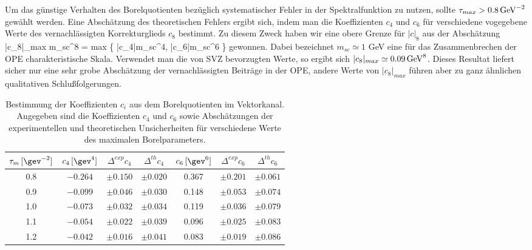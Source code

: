 Um das g\"unstige Verhalten des Borelquotienten bez\"uglich 
systematischer Fehler in der Spektralfunktion zu nutzen, sollte
$\tau_{max}>0.8\,{\rm GeV}^{-2}$ gew\"ahlt werden. Eine 
Absch\"atzung des theoretischen Fehlers ergibt sich, indem man
die Koeffizienten $c_4$ und $c_6$ f\"ur verschiedene vogegebene
Werte des vernachl\"assigten Korrekturglieds $c_8$ bestimmt. Zu 
diesem Zweck haben wir eine obere Grenze f\"ur $|c|_8$ aus der 
Absch\"atzung \cite{Cin91}
\be
  |c_8|_{max} m_{sc}^8 = {\rm max} \left\{ |c_4|m_{sc}^4,
    |c_6|m_{sc}^6 \right\}
\ee
gewonnen. Dabei bezeichnet $m_{sc}\simeq 1$ GeV eine f\"ur das
Zusammenbrechen der OPE charakteristische  Skala. Verwendet
man die von SVZ \cite{SVZ79} bevorzugten Werte, so ergibt sich
$|c_8|_{max}\simeq 0.09\,{\rm GeV}^8$. Dieses Resultat liefert 
sicher nur eine sehr grobe Absch\"atzung der vernachl\"assigten
Beitr\"age in der OPE, andere Werte von $|c_8|_{max}$ f\"uhren
aber zu ganz \"ahnlichen qualitativen Schlu\ss folgerungen.   
\begin{table}
\caption{Bestimmung der Koeffizienten $c_i$ aus dem Borelquotienten
im Vektorkanal. Angegeben sind die Koeffizienten $c_4$ und $c_6$
sowie Absch\"atzungen der experimentellen und theoretischen
Unsicherheiten f\"ur verschiedene Werte des maximalen Borelparameters.}  
\begin{center}
\begin{tabular}{|c||c|c|c||c|c|c||}\hline
 $\tau_m\,[\gev^{-2}]$  &  $c_4\,[\gev^4]$  & $\Delta^{exp} c_4$ &
       $\Delta^{th} c_4$ &  $c_6\,[\gev^6]$  
	     & $\Delta^{exp} c_6$ & $\Delta^{th} c_6$  \\ \hline\hline
    0.8   &$-0.264$ & $\pm 0.150$        & $\pm 0.020$       &
             0.367  & $\pm 0.201$        & $\pm 0.061$   \\
    0.9   &$-0.099$ & $\pm 0.046$        & $\pm 0.030$       &
             0.148  & $\pm 0.053$        & $\pm 0.074$   \\	     
    1.0   &$-0.073$ & $\pm 0.032$        & $\pm 0.034$       &
             0.119  & $\pm 0.036$        & $\pm 0.079$   \\	     
    1.1   &$-0.054$ & $\pm 0.022$        & $\pm 0.039$       &
             0.096  & $\pm 0.025$        & $\pm 0.083$   \\	     
    1.2   &$-0.042$ & $\pm 0.016$        & $\pm 0.041$       &
             0.083  & $\pm 0.019$        & $\pm 0.086$   \\ \hline
\end{tabular}
\end{center}
\end{table}

